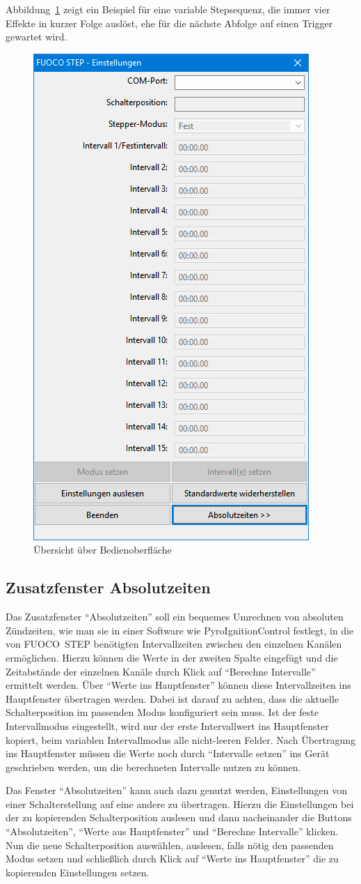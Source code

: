\documentclass[paper=a4, open=any]{scrbook}
\begin{document}
				Abbildung~\ref{fig:beispielsequenz} zeigt ein Beispiel für eine variable Stepsequenz, die immer vier Effekte in kurzer Folge auslöst, ehe für die nächste Abfolge auf einen Trigger gewartet wird.
				
				\begin{figure}[tb]
					\centering\includegraphics[width=.5\textwidth]{gui}
					\caption{Übersicht über Bedienoberfläche}
					\label{fig:beispielsequenz}
				\end{figure}

			\subsection{Zusatzfenster Absolutzeiten}
			\label{sec:absolutzeiten}
				Das Zusatzfenster \enquote{Absolutzeiten} soll ein bequemes Umrechnen von absoluten Zündzeiten, wie man sie in einer Software wie PyroIgnitionControl festlegt, in die von FUOCO~STEP benötigten Intervallzeiten zwischen den einzelnen Kanälen ermöglichen. Hierzu können die Werte in der zweiten Spalte eingefügt und die Zeitabstände der einzelnen Kanäle durch Klick auf \enquote{Berechne Intervalle} ermittelt werden. Über \enquote{Werte ins Hauptfenster} können diese Intervallzeiten ins Hauptfenster übertragen werden. Dabei ist darauf zu achten, dass die aktuelle Schalterposition im passenden Modus konfiguriert sein muss. Ist der feste Intervallmodus eingestellt, wird nur der erste Intervallwert ins Hauptfenster kopiert, beim variablen Intervallmodus alle nicht-leeren Felder. Nach Übertragung ins Hauptfenster müssen die Werte noch durch \enquote{Intervalle setzen} ins Gerät geschrieben werden, um die berechneten Intervalle nutzen zu können.

				Das Fenster \enquote{Absolutzeiten} kann auch dazu genutzt werden, Einstellungen von einer Schalterstellung auf eine andere zu übertragen. Hierzu die Einstellungen bei der zu kopierenden Schalterposition auslesen und dann nacheinander die Buttons \enquote{Absolutzeiten}, \enquote{Werte aus Hauptfenster} und \enquote{Berechne Intervalle} klicken. Nun die neue Schalterposition auswählen, auslesen, falls nötig den passenden Modus setzen und schließlich durch Klick auf \enquote{Werte ins Hauptfenster} die zu kopierenden Einstellungen setzen.
\end{document}
